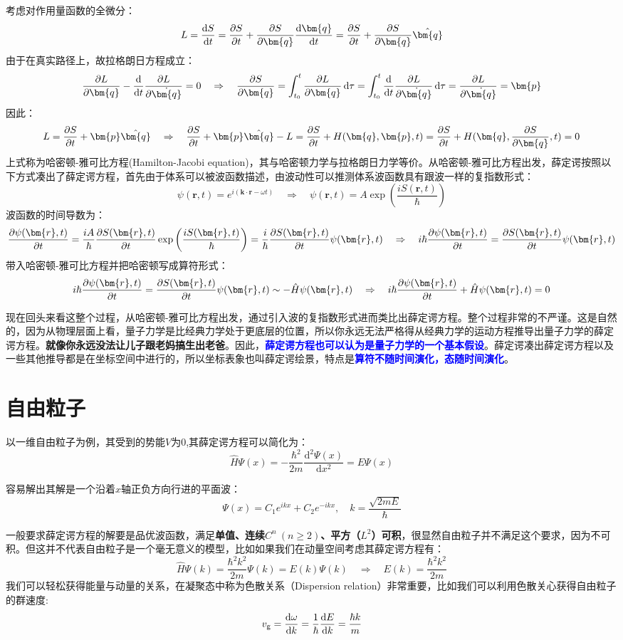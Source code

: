 考虑对作用量函数的全微分：
\[L=\dv{S}{t}=\pdv{S}{t}+\pdv{S}{\bm{q}}\dv{\bm{q}}{t}=\pdv{S}{t}+\pdv{S}{\bm{q}}\hat{\bm{q}}\]
由于在真实路径上，故拉格朗日方程成立：
\[\pdv{L}{\bm{q}}-\dv{t}\pdv{L}{\dot{\bm{q}}}=0 \quad \Rightarrow \quad \pdv{S}{\bm{q}}=\int_{t_0}^{t}\pdv{L}{\bm{q}}\dd{\tau}=\int_{t_0}^{t}\dv{t}\pdv{L}{\dot{\bm{q}}}\dd{\tau}=\pdv{L}{\dot{\bm{q}}}=\bm{p}\]
因此：
\[L=\pdv{S}{t}+\bm{p}\hat{\bm{q}} \quad \Rightarrow \quad \pdv{S}{t}+\bm{p}\hat{\bm{q}}-L=\pdv{S}{t}+H(\bm{q},\bm{p},t)=\pdv{S}{t}+H(\bm{q},\pdv{S}{\bm{q}},t)=0\]
上式称为哈密顿-雅可比方程(Hamilton-Jacobi equation)，其与哈密顿力学与拉格朗日力学等价。从哈密顿-雅可比方程出发，薛定谔按照以下方式凑出了薛定谔方程，首先由于体系可以被波函数描述，由波动性可以推测体系波函数具有跟波一样的复指数形式：
\[\psi(\bm{r},t)=e^{i(\bm{k}\cdot\bm{r}-\omega t)} \quad \Rightarrow \quad \psi(\bm{r},t)=A\exp\left(\frac{iS(\bm{r},t)}{\hbar}\right)\]
波函数的时间导数为：
\[\pdv{\psi(\bm{r},t)}{t}=\frac{iA}{\hbar}\pdv{S(\bm{r},t)}{t}\exp\left(\frac{iS(\bm{r},t)}{\hbar}\right)=\frac{i}{\hbar}\pdv{S(\bm{r},t)}{t}\psi(\bm{r},t) \quad \Rightarrow \quad i\hbar\pdv{\psi(\bm{r},t)}{t}=\pdv{S(\bm{r},t)}{t}\psi(\bm{r},t)\]
带入哈密顿-雅可比方程并把哈密顿写成算符形式：
\[i\hbar\pdv{\psi(\bm{r},t)}{t}=\pdv{S(\bm{r},t)}{t}\psi(\bm{r},t)\sim-\hat{H}\psi(\bm{r},t) \quad \Rightarrow \quad i\hbar\pdv{\psi(\bm{r},t)}{t}+\hat{H}\psi(\bm{r},t)=0\]

现在回头来看这整个过程，从哈密顿-雅可比方程出发，通过引入波的复指数形式进而类比出薛定谔方程。整个过程非常的不严谨。这是自然的，因为从物理层面上看，量子力学是比经典力学处于更底层的位置，所以你永远无法严格得从经典力学的运动方程推导出量子力学的薛定谔方程。\textbf{就像你永远没法让儿子跟老妈搞生出老爸}。因此，\textcolor{blue}{\textbf{薛定谔方程也可以认为是量子力学的一个基本假设}}。薛定谔凑出薛定谔方程以及一些其他推导都是在坐标空间中进行的，所以坐标表象也叫薛定谔绘景，特点是\textcolor{blue}{\textbf{算符不随时间演化，态随时间演化}}。

\newpage
\section{自由粒子}
以一维自由粒子为例，其受到的势能$V$为0,其薛定谔方程可以简化为：
\[\hat{H}\varPsi(x)=-\frac{\hbar^2}{2m}\frac{\mathrm{d}^2\varPsi(x)}{\mathrm{d}x^2}=E\varPsi(x)\]

容易解出其解是一个沿着$x$轴正负方向行进的平面波：
\[\varPsi(x)=C_1e^{ikx}+C_2e^{-ikx}, \quad k=\frac{\sqrt{2mE}}{\hbar}\]

一般要求薛定谔方程的解要是品优波函数，满足\textbf{单值、连续$C^n \ (n \geq 2)$、平方（$L^2$）可积}，很显然自由粒子并不满足这个要求，因为不可积。但这并不代表自由粒子是一个毫无意义的模型，比如如果我们在动量空间考虑其薛定谔方程有：
\[\hat{H}\varPsi(k)=\frac{\hbar^2k^2}{2m}\varPsi(k)=E(k)\varPsi(k) \quad \Rightarrow \quad E(k)=\frac{\hbar^2k^2}{2m}\]
我们可以轻松获得能量与动量的关系，在凝聚态中称为色散关系（Dispersion relation）非常重要，比如我们可以利用色散关心获得自由粒子的群速度:
\[v_{\rm{g}}=\dv{\omega}{k}=\frac{1}{\hbar}\dv{E}{k}=\frac{\hbar k}{m}\]
